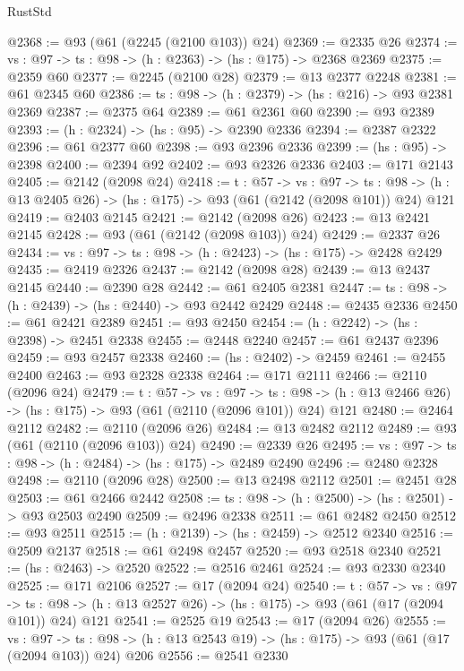 \begin{lexlean}{RustStd}
\begin{coremodule}
{\begin{coremodule}
{{{{{{{{{{{{{@2368 := @93 (@61 (@2245 (@2100 @103)) @24)
@2369 := @2335 @26
@2374 := {vs : @97} -> {ts : @98} -> (h : @2363) -> (hs : @175) -> @2368 @2369
@2375 := @2359 @60
@2377 := @2245 (@2100 @28)
@2379 := @13 @2377 @2248
@2381 := @61 @2345 @60
@2386 := {ts : @98} -> (h : @2379) -> (hs : @216) -> @93 @2381 @2369
@2387 := @2375 @64
@2389 := @61 @2361 @60
@2390 := @93 @2389
@2393 := (h : @2324) -> (hs : @95) -> @2390 @2336
@2394 := @2387 @2322
@2396 := @61 @2377 @60
@2398 := @93 @2396 @2336
@2399 := (hs : @95) -> @2398
@2400 := @2394 @92
@2402 := @93 @2326 @2336
@2403 := @171 @2143
@2405 := @2142 (@2098 @24)
@2418 := {t : @57} ->
  {vs : @97} ->
  {ts : @98} -> (h : @13 @2405 @26) -> (hs : @175) -> @93 (@61 (@2142 (@2098 @101)) @24) @121
@2419 := @2403 @2145
@2421 := @2142 (@2098 @26)
@2423 := @13 @2421 @2145
@2428 := @93 (@61 (@2142 (@2098 @103)) @24)
@2429 := @2337 @26
@2434 := {vs : @97} -> {ts : @98} -> (h : @2423) -> (hs : @175) -> @2428 @2429
@2435 := @2419 @2326
@2437 := @2142 (@2098 @28)
@2439 := @13 @2437 @2145
@2440 := @2390 @28
@2442 := @61 @2405 @2381
@2447 := {ts : @98} -> (h : @2439) -> (hs : @2440) -> @93 @2442 @2429
@2448 := @2435 @2336
@2450 := @61 @2421 @2389
@2451 := @93 @2450
@2454 := (h : @2242) -> (hs : @2398) -> @2451 @2338
@2455 := @2448 @2240
@2457 := @61 @2437 @2396
@2459 := @93 @2457 @2338
@2460 := (hs : @2402) -> @2459
@2461 := @2455 @2400
@2463 := @93 @2328 @2338
@2464 := @171 @2111
@2466 := @2110 (@2096 @24)
@2479 := {t : @57} ->
  {vs : @97} ->
  {ts : @98} -> (h : @13 @2466 @26) -> (hs : @175) -> @93 (@61 (@2110 (@2096 @101)) @24) @121
@2480 := @2464 @2112
@2482 := @2110 (@2096 @26)
@2484 := @13 @2482 @2112
@2489 := @93 (@61 (@2110 (@2096 @103)) @24)
@2490 := @2339 @26
@2495 := {vs : @97} -> {ts : @98} -> (h : @2484) -> (hs : @175) -> @2489 @2490
@2496 := @2480 @2328
@2498 := @2110 (@2096 @28)
@2500 := @13 @2498 @2112
@2501 := @2451 @28
@2503 := @61 @2466 @2442
@2508 := {ts : @98} -> (h : @2500) -> (hs : @2501) -> @93 @2503 @2490
@2509 := @2496 @2338
@2511 := @61 @2482 @2450
@2512 := @93 @2511
@2515 := (h : @2139) -> (hs : @2459) -> @2512 @2340
@2516 := @2509 @2137
@2518 := @61 @2498 @2457
@2520 := @93 @2518 @2340
@2521 := (hs : @2463) -> @2520
@2522 := @2516 @2461
@2524 := @93 @2330 @2340
@2525 := @171 @2106
@2527 := @17 (@2094 @24)
@2540 := {t : @57} ->
  {vs : @97} ->
  {ts : @98} -> (h : @13 @2527 @26) -> (hs : @175) -> @93 (@61 (@17 (@2094 @101)) @24) @121
@2541 := @2525 @19
@2543 := @17 (@2094 @26)
@2555 := {vs : @97} ->
  {ts : @98} -> (h : @13 @2543 @19) -> (hs : @175) -> @93 (@61 (@17 (@2094 @103)) @24) @206
@2556 := @2541 @2330
}}}}}}}}}}}}}
\end{coremodule}}
\end{coremodule}
\end{lexlean}

